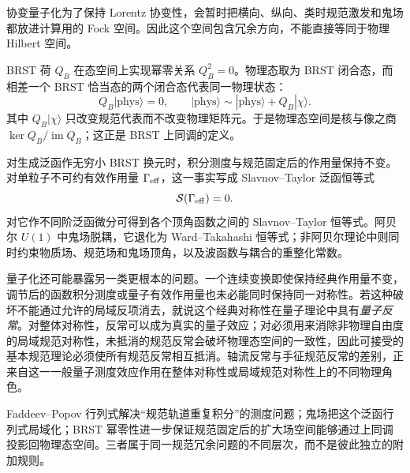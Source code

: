 协变量子化为了保持 Lorentz 协变性，会暂时把横向、纵向、类时规范激发和鬼场都放进计算用的 Fock 空间。因此这个空间包含冗余方向，不能直接等同于物理 Hilbert 空间。

BRST 荷 $Q_B$ 在态空间上实现幂零关系 $Q_B^2=0$。物理态取为 BRST 闭合态，而相差一个 BRST 恰当态的两个闭合态代表同一物理状态：
\begin{equation*}
 Q_B|\mathrm{phys}\rangle=0,
 \qquad
 |\mathrm{phys}\rangle\sim|\mathrm{phys}\rangle+Q_B|\chi\rangle.
\end{equation*}
其中 $Q_B|\chi\rangle$ 只改变规范代表而不改变物理矩阵元。于是物理态空间是核与像之商 $\ker Q_B/\operatorname{im}Q_B$；这正是 BRST 上同调的定义。

对生成泛函作无穷小 BRST 换元时，积分测度与规范固定后的作用量保持不变。对单粒子不可约有效作用量 $\Gamma_{\rm eff}$，这一事实写成 Slavnov--Taylor 泛函恒等式
\begin{equation}
 {\mathcal S(\Gamma_{\rm eff})=0.}
 \label{eq:st-functional-general-dp11}
\end{equation}
对它作不同阶泛函微分可得到各个顶角函数之间的 Slavnov--Taylor 恒等式。阿贝尔 $U(1)$ 中鬼场脱耦，它退化为 Ward--Takahashi 恒等式；非阿贝尔理论中则同时约束物质场、规范场和鬼场顶角，以及波函数与耦合的重整化常数。

量子化还可能暴露另一类更根本的问题。一个连续变换即使保持经典作用量不变，调节后的函数积分测度或量子有效作用量也未必能同时保持同一对称性。若这种破坏不能通过允许的局域反项消去，就说这个经典对称性在量子理论中具有\emph{量子反常}。对整体对称性，反常可以成为真实的量子效应；对必须用来消除非物理自由度的局域规范对称性，未抵消的规范反常会破坏物理态空间的一致性，因此可接受的基本规范理论必须使所有规范反常相互抵消。轴流反常与手征规范反常的差别，正来自这一一般量子测度效应作用在整体对称性或局域规范对称性上的不同物理角色。

Faddeev--Popov 行列式解决“规范轨道重复积分”的测度问题；鬼场把这个泛函行列式局域化；BRST 幂零性进一步保证规范固定后的扩大场空间能够通过上同调投影回物理态空间。三者属于同一规范冗余问题的不同层次，而不是彼此独立的附加规则。



